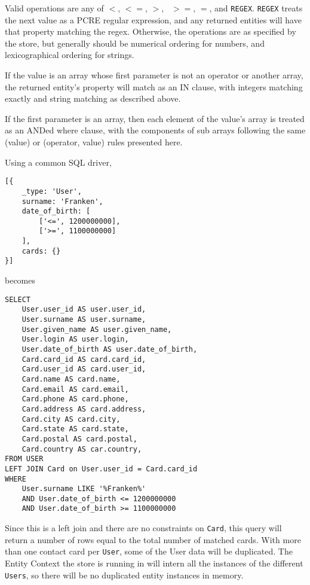 \documentclass{article}
\newcommand{\ilcode}{\tt}
\begin{document}
Valid operations are any of {\ilcode $<$}, {\ilcode $<=$}, {\ilcode $>$}, {\ilcode
$>=$}, {\ilcode $=$}, and {\ilcode REGEX}. {\ilcode REGEX} treats the next value
as a PCRE regular expression, and any returned entities will have that property
matching the regex. Otherwise, the operations are as specified by the store, but
generally should be numerical ordering for numbers, and lexicographical ordering
for strings.



If the value is an array whose first parameter is not an operator or another
array, the returned entity's property will match as an IN clause, with integers
matching exactly and string matching as described above.

If the first parameter is an array, then each element of the value's array is
treated as an ANDed where clause, with the components of sub arrays following
the same (value) or (operator, value) rules presented here.

Using a common SQL driver,
\linespread{1}
\begin{lstlisting}
[{
	_type: 'User',
	surname: 'Franken',
	date_of_birth: [
		['<=', 1200000000],
		['>=', 1100000000]
	],
	cards: {}
}]
\end{lstlisting}
\linespread{1.6}

becomes

\linespread{1}
\begin{lstlisting}
SELECT
	User.user_id AS user.user_id,
	User.surname AS user.surname,
	User.given_name AS user.given_name,
	User.login AS user.login,
	User.date_of_birth AS user.date_of_birth,
	Card.card_id AS card.card_id,
	Card.user_id AS card.user_id,
	Card.name AS card.name,
	Card.email AS card.email,
	Card.phone AS card.phone,
	Card.address AS card.address,
	Card.city AS card.city,
	Card.state AS card.state,
	Card.postal AS card.postal,
	Card.country AS car.country,
FROM USER
LEFT JOIN Card on User.user_id = Card.card_id
WHERE
	User.surname LIKE '%Franken%'
	AND User.date_of_birth <= 1200000000
	AND User.date_of_birth >= 1100000000
\end{lstlisting}
\linespread{1.6}

Since this is a left join and there are no constraints on {\ilcode Card}, this
query will return a number of rows equal to the total number of matched cards.
With more than one contact card per {\ilcode User}, some of the User data will
be duplicated. The Entity Context the store is running in will intern all the
instances of the different {\ilcode Users}, so there will be no duplicated entity
instances in memory.
\end{document}

